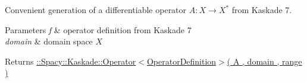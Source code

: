 \-Convenient generation of a differentiable operator $A: X\rightarrow X^*$ from \-Kaskade 7. 


\begin{DoxyParams}{\-Parameters}
{\em f} & operator definition from \-Kaskade 7 \\
\hline
{\em domain} & domain space $X$ \\
\hline
\end{DoxyParams}
\begin{DoxyReturn}{\-Returns}
\hyperlink{classSpacy_1_1Kaskade_1_1Operator}{\-:\-:\-Spacy\-:\-:\-Kaskade\-:\-:\-Operator$<$\-Operator\-Definition$>$( \-A , domain , range )} 
\end{DoxyReturn}
